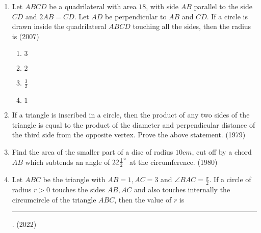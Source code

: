\begin{enumerate}[label=\thesubsection.\arabic*,ref=\thesubsection.\theenumi]
\begin{multicols}{4}
    \end{multicols}
%
\item Let $ABCD$ be a quadrilateral with area $18$, with side $AB$ parallel to the side $CD$ and $2AB = CD$. Let $AD$ be perpendicular to $AB$ and $CD$. If a circle is drawn inside the quadrilateral $ABCD$ touching all the sides, then the radius is
\hfill (2007)
		\begin{multicols}{4}
\begin{enumerate}
\item $3$
\item $2$
\item $\frac{3}{2}$
\item $1$
\end{enumerate}
\end{multicols}
%
     	\item If a triangle is inscribed in a circle, then the product of any two sides of the triangle is equal to the product of the diameter and perpendicular distance of the third side from the opposite vertex. Prove the above statement.
     \hfill {(1979)}
     	\item Find the area of the smaller part of a disc of radius $10 cm$, cut off by a chord $AB$ which subtends an angle of $22\frac{1}{2} \degree$ at the circumference.
     \hfill {(1980)}
 \item Let $ABC$ be the triangle with $AB = 1, AC = 3$ and $\angle BAC=\frac{\pi}{2}$. If a circle of radius $r > 0$ touches the sides $AB, AC$ and also touches internally the circumcircle of the triangle $ABC$, then the value of $r$ is\rule{1cm}{0.1pt}.
	\hfill (2022)
\end{enumerate}
